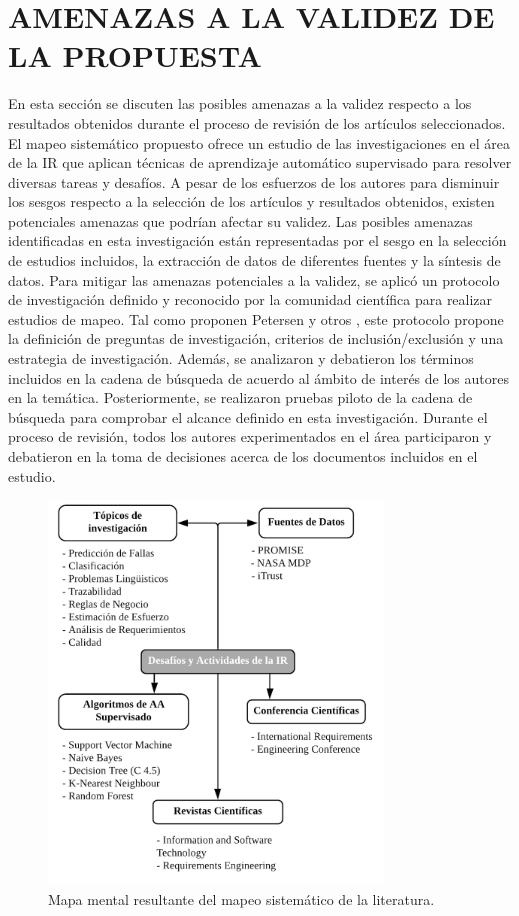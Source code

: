 \documentclass[journal]{IEEEtran}
\begin{document}
\section{AMENAZAS A LA VALIDEZ DE LA PROPUESTA}

En esta sección se discuten las posibles amenazas a la validez respecto a los resultados obtenidos durante el proceso de revisión de los artículos seleccionados. El mapeo sistemático propuesto ofrece un estudio de las investigaciones en el área de la IR que aplican técnicas de aprendizaje automático supervisado para resolver diversas tareas y desafíos. A pesar de los esfuerzos de los autores para disminuir los sesgos respecto a la selección de los artículos y resultados obtenidos, existen potenciales amenazas que podrían afectar su validez. Las posibles amenazas identificadas en esta investigación están representadas por el sesgo en la selección de estudios incluidos, la extracción de datos de diferentes fuentes y la síntesis de datos. Para mitigar las amenazas potenciales a la validez, se aplicó un protocolo de investigación definido y reconocido por la comunidad científica para realizar estudios de mapeo. Tal como proponen Petersen y otros \cite{petersen2008systematic}, este protocolo propone la definición de preguntas de investigación, criterios de inclusión/exclusión y una estrategia de investigación. Además, se analizaron y debatieron los términos incluidos en la cadena de búsqueda de acuerdo al ámbito de interés de los autores en la temática. Posteriormente, se realizaron pruebas piloto de la cadena de búsqueda para comprobar el alcance definido en esta investigación. Durante el proceso de revisión, todos los autores experimentados en el área participaron y debatieron en  la toma de decisiones acerca de los documentos incluidos en el estudio.


\begin{figure}[!t]
\centering
\includegraphics[width=3.5in]{figures/figure12_Guada.png}
\caption{Mapa mental resultante del mapeo sistemático de la literatura.}
\label{fig12}
\end{figure}
\end{document}
